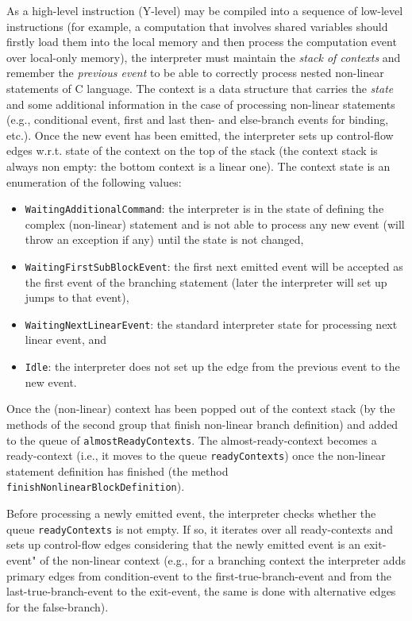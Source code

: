 As a high-level instruction (Y-level) may be compiled into a sequence of low-level instructions (for example, a computation that involves shared variables should firstly load them into the local memory and then process the computation event over local-only memory), the interpreter must maintain the \textit{stack of contexts} and remember the \textit{previous event} to be able to correctly process nested non-linear statements of C language.
The context is a data structure that carries the \textit{state} and some additional information in the case of processing non-linear statements (e.g., conditional event, first and last then- and else-branch events for binding, etc.).
Once the new event has been emitted, the interpreter sets up control-flow edges w.r.t. state of the context on the top of the stack (the context stack is always non empty: the bottom context is a linear one).
The context state is an enumeration of the following values:
\begin{itemize}
\item \texttt{WaitingAdditionalCommand}: the interpreter is in the state of defining the complex (non-linear) statement and is not able to process any new event (will throw an exception if any) until the state is not changed,
\item \texttt{WaitingFirstSubBlockEvent}: the first next emitted event will be accepted as the first event of the branching statement (later the interpreter will set up jumps to that event),
\item \texttt{WaitingNextLinearEvent}: the standard interpreter state for processing next linear event, and
\item \texttt{Idle}: the interpreter does not set up the edge from the previous event to the new event.
\end{itemize}

Once the (non-linear) context has been popped out of the context stack (by the methods of the second group that finish non-linear branch definition) and added to the queue of \texttt{almostReadyContexts}.
The almost-ready-context becomes a ready-context (i.e., it moves to the queue \texttt{readyContexts}) once the non-linear statement definition has finished (the method \texttt{finishNonlinearBlockDefinition}).

Before processing a newly emitted event, the interpreter checks whether the queue \texttt{readyContexts} is not empty.
If so, it iterates over all ready-contexts and sets up control-flow edges considering that the newly emitted event is an exit-event" of the non-linear context (e.g., for a branching context the interpreter adds primary edges from condition-event to the first-true-branch-event and from the last-true-branch-event to the exit-event, the same is done with alternative edges for the false-branch).

